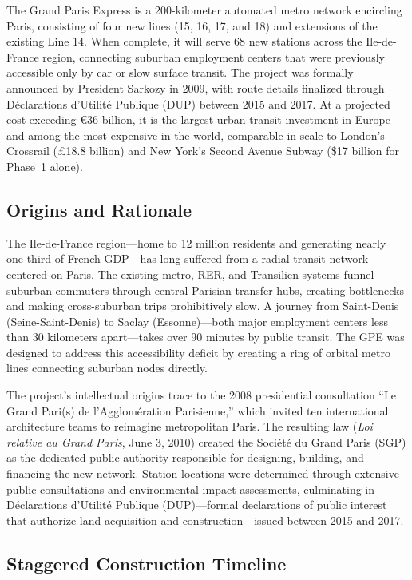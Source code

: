 \documentclass[12pt]{article}
\begin{document}
The Grand Paris Express is a 200-kilometer automated metro network encircling Paris, consisting of four new lines (15, 16, 17, and 18) and extensions of the existing Line 14. When complete, it will serve 68 new stations across the Ile-de-France region, connecting suburban employment centers that were previously accessible only by car or slow surface transit. The project was formally announced by President Sarkozy in 2009, with route details finalized through D\'{e}clarations d'Utilit\'{e} Publique (DUP) between 2015 and 2017. At a projected cost exceeding \euro36 billion, it is the largest urban transit investment in Europe and among the most expensive in the world, comparable in scale to London's Crossrail (\pounds18.8 billion) and New York's Second Avenue Subway (\$17 billion for Phase~1 alone).

\subsection{Origins and Rationale}

The Ile-de-France region---home to 12 million residents and generating nearly one-third of French GDP---has long suffered from a radial transit network centered on Paris. The existing metro, RER, and Transilien systems funnel suburban commuters through central Parisian transfer hubs, creating bottlenecks and making cross-suburban trips prohibitively slow. A journey from Saint-Denis (Seine-Saint-Denis) to Saclay (Essonne)---both major employment centers less than 30 kilometers apart---takes over 90 minutes by public transit. The GPE was designed to address this accessibility deficit by creating a ring of orbital metro lines connecting suburban nodes directly.

The project's intellectual origins trace to the 2008 presidential consultation ``Le Grand Pari(s) de l'Agglom\'{e}ration Parisienne,'' which invited ten international architecture teams to reimagine metropolitan Paris. The resulting law (\textit{Loi relative au Grand Paris}, June 3, 2010) created the Soci\'{e}t\'{e} du Grand Paris (SGP) as the dedicated public authority responsible for designing, building, and financing the new network. Station locations were determined through extensive public consultations and environmental impact assessments, culminating in D\'{e}clarations d'Utilit\'{e} Publique (DUP)---formal declarations of public interest that authorize land acquisition and construction---issued between 2015 and 2017.

\subsection{Staggered Construction Timeline}
\end{document}
